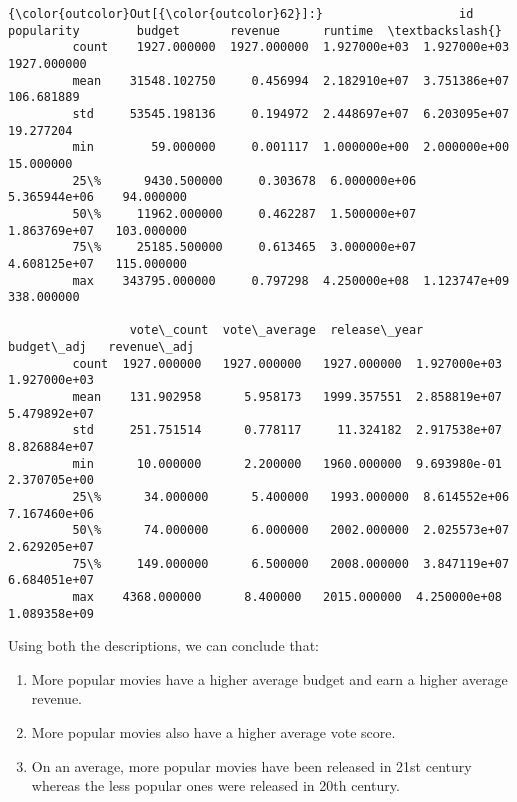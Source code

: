 \documentclass[11pt]{article}
\providecommand{\tightlist}{%
      \setlength{\itemsep}{0pt}\setlength{\parskip}{0pt}}
\begin{document}
\begin{Verbatim}[commandchars=\\\{\}]
{\color{outcolor}Out[{\color{outcolor}62}]:}                   id   popularity        budget       revenue      runtime  \textbackslash{}
         count    1927.000000  1927.000000  1.927000e+03  1.927000e+03  1927.000000   
         mean    31548.102750     0.456994  2.182910e+07  3.751386e+07   106.681889   
         std     53545.198136     0.194972  2.448697e+07  6.203095e+07    19.277204   
         min        59.000000     0.001117  1.000000e+00  2.000000e+00    15.000000   
         25\%      9430.500000     0.303678  6.000000e+06  5.365944e+06    94.000000   
         50\%     11962.000000     0.462287  1.500000e+07  1.863769e+07   103.000000   
         75\%     25185.500000     0.613465  3.000000e+07  4.608125e+07   115.000000   
         max    343795.000000     0.797298  4.250000e+08  1.123747e+09   338.000000   
         
                 vote\_count  vote\_average  release\_year    budget\_adj   revenue\_adj  
         count  1927.000000   1927.000000   1927.000000  1.927000e+03  1.927000e+03  
         mean    131.902958      5.958173   1999.357551  2.858819e+07  5.479892e+07  
         std     251.751514      0.778117     11.324182  2.917538e+07  8.826884e+07  
         min      10.000000      2.200000   1960.000000  9.693980e-01  2.370705e+00  
         25\%      34.000000      5.400000   1993.000000  8.614552e+06  7.167460e+06  
         50\%      74.000000      6.000000   2002.000000  2.025573e+07  2.629205e+07  
         75\%     149.000000      6.500000   2008.000000  3.847119e+07  6.684051e+07  
         max    4368.000000      8.400000   2015.000000  4.250000e+08  1.089358e+09  
\end{Verbatim}
            
    Using both the descriptions, we can conclude that:

\begin{enumerate}
\def\labelenumi{\arabic{enumi}.}
\tightlist
\item
  More popular movies have a higher average budget and earn a higher
  average revenue.
\item
  More popular movies also have a higher average vote score.
\item
  On an average, more popular movies have been released in 21st century
  whereas the less popular ones were released in 20th century.
\end{enumerate}
\end{document}
